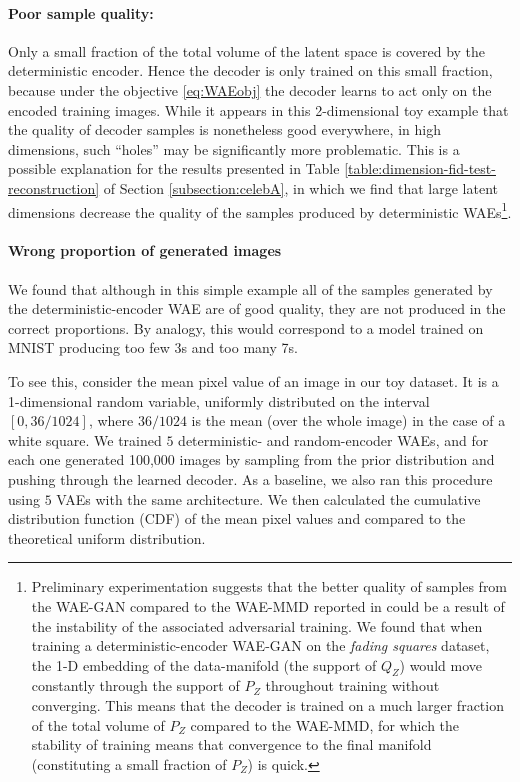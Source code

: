 \documentclass{article}
\begin{document}
\paragraph{Poor sample quality:}
Only a small fraction of the total volume of the latent space is covered by the deterministic encoder.
Hence the decoder is only trained on this small fraction, because under the objective \eqref{eq:WAEobj} the decoder learns to act only on the encoded training images. 
While it appears in this 2-dimensional toy example that the quality of decoder samples is nonetheless good everywhere, in high dimensions, such ``holes'' may be significantly more problematic. This is a possible explanation for the results presented in Table \ref{table:dimension-fid-test-reconstruction} of Section \ref{subsection:celebA}, in which we find that large latent dimensions decrease the quality of the samples produced by deterministic WAEs\footnote{
Preliminary experimentation suggests that the better quality of samples from the {WAE-GAN} compared to the {WAE-MMD} reported in \cite{TBG+17} could be a result of the instability of the associated adversarial training. We found that when training a deterministic-encoder {WAE-GAN} on the \emph{fading squares} dataset, the {1-D} embedding of the data-manifold (the support of $Q_Z$) would move constantly through the support of $P_Z$ throughout training without converging. This means that the decoder is trained on a much larger fraction of the total volume of $P_Z$ compared to the {WAE-MMD}, for which the stability of training means that convergence to the final manifold (constituting a small fraction of $P_Z$) is quick.
}. 

\paragraph{Wrong proportion of generated images}
We found that although in this simple example all of the samples generated by the deterministic-encoder WAE are of good quality, they are not produced in the correct proportions. 
By analogy, this would correspond to a model trained on MNIST producing too few 3s and too many 7s.

To see this, consider the mean pixel value of an image in our toy dataset. It is a 1-dimensional random variable, uniformly distributed on the interval $[0, 36/1024]$, where $36/1024$ is the mean (over the whole image) in the case of a white square. We trained $5$ deterministic- and random-encoder WAEs, and for each one generated 100,000 images by sampling from the prior distribution and pushing through the learned decoder. As a baseline, we also ran this procedure using $5$ VAEs with the same architecture. We then calculated the cumulative distribution function (CDF) of the mean pixel values and compared to the theoretical uniform distribution. 
\end{document}
